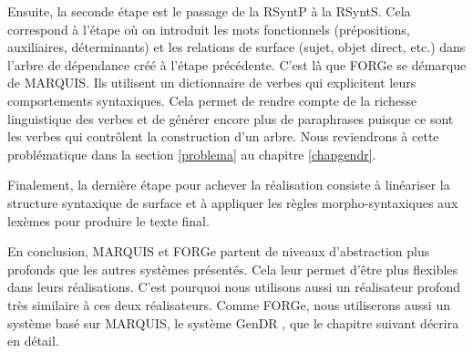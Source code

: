 Ensuite, la seconde étape est le passage de la \ac{RSyntP} à la \ac{RSyntS}. Cela correspond à l'étape où on introduit les mots fonctionnels (prépositions, auxiliaires, déterminants) et les relations de surface (sujet, objet direct, etc.) dans l'arbre de dépendance créé à l'étape précédente. C'est là que FORGe se démarque de MARQUIS. Ils utilisent un dictionnaire de verbes qui explicitent leurs comportements syntaxiques. Cela permet de rendre compte de la richesse linguistique des verbes et de générer encore plus de paraphrases puisque ce sont les verbes qui contrôlent la construction d'un arbre. Nous reviendrons à cette problématique dans la section \ref{problema} au chapitre \ref{chapgendr}.

Finalement, la dernière étape pour achever la réalisation consiste à linéariser la structure syntaxique de surface et à appliquer les règles morpho-syntaxiques aux lexèmes pour produire le texte final.

En conclusion, MARQUIS et FORGe partent de niveaux d'abstraction plus profonds que les autres systèmes présentés. Cela leur permet d'être plus flexibles dans leurs réalisations. C'est pourquoi nous utilisons aussi un réalisateur profond très similaire à ces deux réalisateurs. Comme FORGe, nous utiliserons aussi un système basé sur MARQUIS, le système GenDR \citep{lambrey15,LambreyImplementationcollocationspour2017,lareau18}, que le chapitre suivant décrira en détail.

